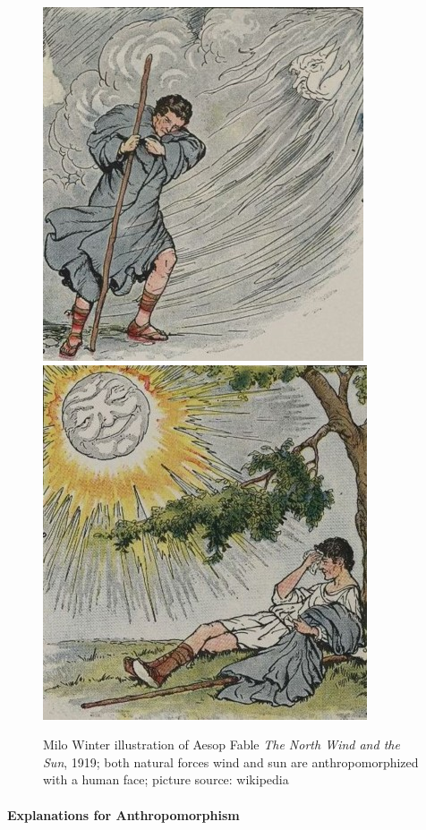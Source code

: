 \documentclass{frontiersSCNS} %
\begin{document}
 \begin{figure}\centering
  \includegraphics[scale=0.91]{north-wind.jpg}
  \includegraphics[scale=0.91]{sun.jpg}
 \caption{Milo Winter illustration of Aesop Fable \textit{The North Wind and the Sun}, 1919; both natural forces wind and sun are anthropomorphized with a human face; picture source: wikipedia}
 \label{fig:1}       %
 \end{figure}
 

\paragraph{Explanations for Anthropomorphism}
\label{sec:explanations}
\end{document}
